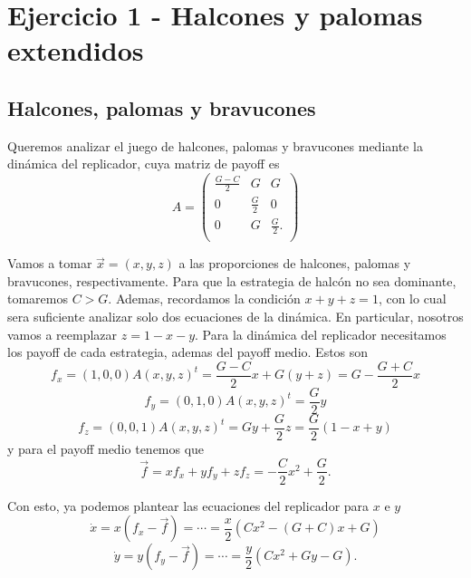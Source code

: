 \section*{Ejercicio 1 - Halcones y palomas extendidos}

\subsection*{Halcones, palomas y bravucones}

Queremos analizar el juego de halcones, palomas y bravucones mediante la dinámica del replicador, cuya matriz de payoff es
\begin{equation}
    A =
\begin{pmatrix}
\frac{G-C}{2} & G & G \\[4pt]
0 & \frac{G}{2} & 0 \\[4pt]
0 & G & \frac{G}{2}. \\
\end{pmatrix}
\end{equation}

Vamos a tomar $\vec{x} = \left(x,y,z\right)$ a las proporciones de halcones, palomas y bravucones, respectivamente. Para que la estrategia de halcón no sea dominante, tomaremos $C>G$. Ademas, recordamos la condición $x+y+z = 1$, con lo cual sera suficiente analizar solo dos ecuaciones de la dinámica. En particular, nosotros vamos a reemplazar $z=1-x-y$. Para la dinámica del replicador necesitamos los payoff de cada estrategia, ademas del payoff medio. Estos son
\begin{equation}
    f_x = \left(1,0,0\right) A \left(x,y,z\right)^t = \frac{G-C}{2}x + G\left(y+z\right) = G - \frac{G+C}{2}x
\end{equation}
\begin{equation}
    f_y = \left(0,1,0\right) A \left(x,y,z\right)^t = \frac{G}{2} y
\end{equation}
\begin{equation}
    f_z = \left(0,0,1\right) A \left(x,y,z\right)^t = Gy + \frac{G}{2}z = \frac{G}{2} \left(1-x+y\right)
\end{equation}
y para el payoff medio tenemos que
\begin{equation}
    \vec{f} = xf_x + yf_y + zf_z = -\frac{C}{2} x^2 + \frac{G}{2}.
\end{equation}

Con esto, ya podemos plantear las ecuaciones del replicador para $x$ e $y$
\begin{equation}
    \dot{x} = x \left(f_x - \vec{f}\right) = \cdots = \frac{x}{2} \left( Cx^2  - \left(G+C\right)x +G  \right)
    \label{eq1:x}
\end{equation}
\begin{equation}
    \dot{y} = y \left(f_y - \vec{f}\right) = \cdots = \frac{y}{2} \left(Cx^2 + Gy - G \right).
    \label{eq2:y}
\end{equation}

